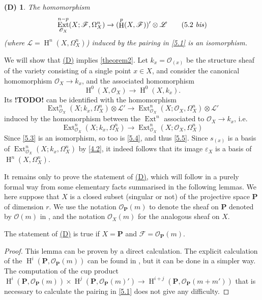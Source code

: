 \documentclass{article}
\theoremstyle{plain}
\newenvironment{lemma}[1]
    {\renewcommand\theinnercustomlemma{#1}\innercustomlemma}
    {\endinnercustomlemma}
\newtheorem*{denv}{(D)}
\theoremstyle{definition}
\newcommand{\sh}{\mathscr}
\newcommand{\bb}{\mathbf}
\DeclareMathOperator{\Ext}{Ext}
\DeclareMathOperator{\HH}{H}
\newcommand{\todo}{\textbf{ !TODO! }}
\newcommand{\oldpage}[1]{\marginpar{\footnotesize$\Big\vert$ \textit{p.~#1}}}
\begin{document}
\begin{denv}
\label{(D)}
  The homomorphism
  \[
  \label{5.2bis}
    \Ext_{\sh{O}_X}^{n-p}(X;\sh{F},\Omega_X^n) \to (\HH^p(X,\sh{F}))'\otimes\sh{L}
  \tag{5.2 \emph{bis}}
  \]
  (where $\sh{L}=\HH^n(X,\Omega_X^n)$) induced by the pairing in \cref{5.1} is an isomorphism.
\end{denv}

We will show that \hyperref[(D)]{(D)} implies \cref{theorem2}.
Let $k_x=\sh{O}_{(x)}$ be the structure sheaf of the variety consisting of a single point $x\in X$, and consider the canonical homomorphism $\sh{O}_X\to k_x$, and the associated homomorphism
\[
\label{5.3}
  \HH^0(X,\sh{O}_X) \to \HH^0(X,k_x).
\tag{5.3}
\]
Its \todo can be identified with the homomorphism
\[
\label{5.4}
  \Ext_{\sh{O}_X}^n(X;k_x,\Omega_X^n)\otimes\sh{L}' \to \Ext_{\sh{O}_X}^n(X;\sh{O}_X,\Omega_X^n)\otimes\sh{L}'
\tag{5.4}
\]
induced by the homomorphism between the $\Ext^n$ associated to $\sh{O}_X\to k_x$, i.e.
\[
\label{5.5}
  \Ext_{\sh{O}_X}^n(X;k_x,\Omega_X^n) \to \Ext_{\sh{O}_X}^n(X;\sh{O}_X,\Omega_X^n)
\tag{5.5}
\]
\oldpage{149-15}
Since \cref{5.3} is an isomorphism, so too is \cref{5.4}, and thus \cref{5.5}.
Since $s_{(x)}$ is a basis of $\Ext_{\sh{O}_X}^n(X;k_x,\Omega_X^n)$ by \cref{4.2}, it indeed follows that its image $\varepsilon_X$ is a basis of $\HH^n(X,\Omega_X^n)$.

It remains only to prove the statement of \hyperref[(D)]{(D)}, which will follow in a purely formal way from some elementary facts summarised in the following lemmas.
We here suppose that $X$ is a closed subset (singular or not) of the projective space $\bb{P}$ of dimension $r$.
We use the notation $\sh{O}_\bb{P}(m)$ to denote the sheaf on $\bb{P}$ denoted by $\sh{O}(m)$ in \cite{3}, and the notation $\sh{O}_X(m)$ for the analogous sheaf on $X$.

\begin{lemma}{2}
\label{lemma2}
  The statement of \hyperref[(D)]{(D)} is true if $X=\bb{P}$ and $\sh{F}=\sh{O}_\bb{P}(m)$.
\end{lemma}

\begin{proof}
  This lemma can be proven by a direct calculation.
  The explicit calculation of the $\HH^i(\bb{P},\sh{O}_\bb{P}(m))$ can be found in \cite{3}, but it can be done in a simpler way.
  The computation of the cup product $\HH^i(\bb{P},\sh{O}_\bb{P}(m))\times\HH^j(\bb{P},\sh{O}_\bb{P}(m)') \to \HH^{i+j}(\bb{P},\sh{O}_\bb{P}(m+m'))$ that is necessary to calculate the pairing in \cref{5.1} does not give any difficulty.
\end{proof}
\end{document}
